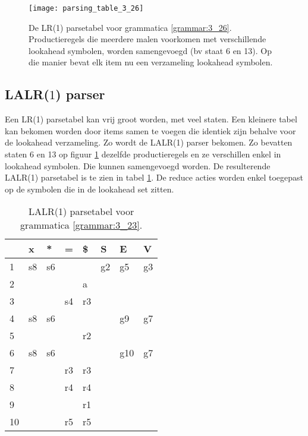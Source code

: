 \begin{figure}[ht]
	\centering
	\texttt{[image: parsing\_table\_3\_26]}
	\caption{De LR(1) parsetabel voor grammatica \ref{grammar:3_26}. Productieregels die meerdere malen voorkomen met verschillende lookahead symbolen, worden samengevoegd (bv staat 6 en 13). Op die manier bevat elk item nu een verzameling lookahead symbolen.}
	\label{fig:parsing_table_3_26} 
\end{figure}


\subsection{LALR($1$) parser}
Een LR(1) parsetabel kan vrij groot worden, met veel staten. Een kleinere tabel kan bekomen worden door items samen te voegen die identiek zijn behalve voor de lookahead verzameling. Zo wordt de LALR(1) parser bekomen. Zo bevatten staten 6 en 13 op figuur \ref{fig:parsing_table_3_26} dezelfde productieregels en ze verschillen enkel in lookahead symbolen. Die kunnen samengevoegd worden. De resulterende LALR(1) parsetabel is te zien in tabel \ref{table:slr_parse_table_3_26_LALR}. De reduce acties worden enkel toegepast op de symbolen die in de lookahead set zitten.
 
\begin{table}[ht]
	\centering
	\begin{tabular}{l|llll|lll|}
		& x   & *  & = & \$ & S  & E  & V \\
		\hline
		1 & s8  & s6 &   &    & g2 & g5 & g3 \\
		2 &     &    &   &  a &    &    &    \\
		3 &     &    & s4& r3 &    &    &    \\
		4 & s8  & s6 &   &    &    & g9 &  g7  \\
		5 &     &    &   & r2 &    &    &    \\
		6 & s8  & s6 &   &    &    & g10& g7\\
		7 &     &    & r3 & r3 &    &    &    \\
		8 &     &    &r4 & r4 &    &    &    \\
		9 &     &    &   & r1 &    &    &    \\
		10 &     &    & r5& r5 &    &    &    \\
		\hline
	\end{tabular}
	\caption{LALR(1) parsetabel voor grammatica \ref{grammar:3_23}.}
	\label{table:slr_parse_table_3_26_LALR}
\end{table}